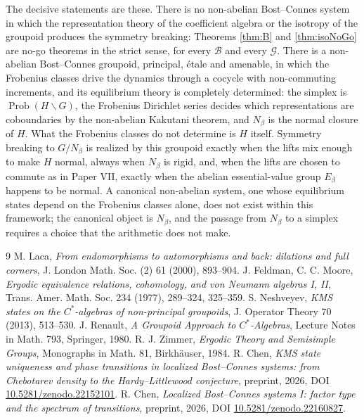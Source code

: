 \documentclass[11pt]{amsart}
\numberwithin{equation}{section}
\theoremstyle{definition}
\theoremstyle{remark}
\newcommand{\cB}{\mathcal{B}}
\newcommand{\cG}{\mathcal{G}}
\newcommand{\Prob}{\operatorname{Prob}}
\begin{document}
The decisive statements are these. There is no non-abelian Bost--Connes system in which
the representation theory of the coefficient algebra or the isotropy of the groupoid
produces the symmetry breaking: Theorems \ref{thm:B} and \ref{thm:isoNoGo} are no-go
theorems in the strict sense, for every $\cB$ and every $\cG$. There is a non-abelian
Bost--Connes groupoid, principal, \'etale and amenable, in which the Frobenius classes
drive the dynamics through a cocycle with non-commuting increments, and its equilibrium
theory is completely determined: the simplex is $\Prob(H\backslash G)$, the Frobenius
Dirichlet series decides which representations are coboundaries by the non-abelian
Kakutani theorem, and $N_\beta$ is the normal closure of $H$. What the Frobenius classes do
not determine is $H$ itself. Symmetry breaking to $G/N_\beta$ is realized by this groupoid
exactly when the lifts mix enough to make $H$ normal, always when $N_\beta$ is rigid, and,
when the lifts are chosen to commute as in Paper VII, exactly when the abelian
essential-value group $E_\beta$ happens to be normal. A canonical
non-abelian system, one whose equilibrium states depend on the Frobenius classes alone,
does not exist within this framework; the canonical object is $N_\beta$, and the passage
from $N_\beta$ to a simplex requires a choice that the arithmetic does not make.

\begin{thebibliography}{9}
 M. Laca, \emph{From endomorphisms to automorphisms and back: dilations and full corners}, J. London Math. Soc. (2) 61 (2000), 893--904.
 J. Feldman, C. C. Moore, \emph{Ergodic equivalence relations, cohomology, and von Neumann algebras I, II}, Trans. Amer. Math. Soc. 234 (1977), 289--324, 325--359.
 S. Neshveyev, \emph{KMS states on the $C^*$-algebras of non-principal groupoids}, J. Operator Theory 70 (2013), 513--530.
 J. Renault, \emph{A Groupoid Approach to $C^*$-Algebras}, Lecture Notes in Math. 793, Springer, 1980.
 R. J. Zimmer, \emph{Ergodic Theory and Semisimple Groups}, Monographs in Math. 81, Birkh\"auser, 1984.
 R. Chen, \emph{KMS state uniqueness and phase transitions in localized Bost--Connes systems: from Chebotarev density to the Hardy--Littlewood conjecture}, preprint, 2026, DOI \href{https://doi.org/10.5281/zenodo.22152101}{10.5281/zenodo.22152101}.
 R. Chen, \emph{Localized Bost--Connes systems I: factor type and the spectrum of transitions}, preprint, 2026, DOI \href{https://doi.org/10.5281/zenodo.22160827}{10.5281/zenodo.22160827}.
\end{thebibliography}
\end{document}
